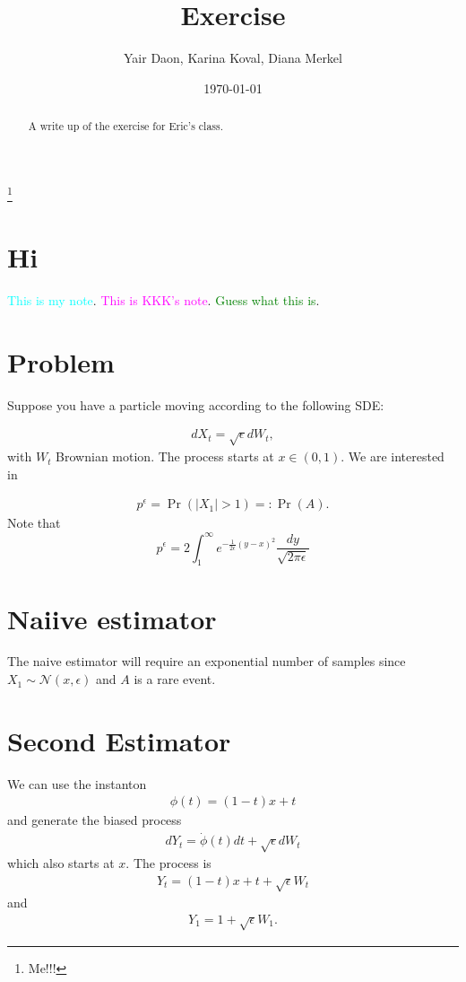 \documentclass[11pt]{amsart}
\newcommand{\N}{\mathcal{N}}
\newcommand{\want}{p^{\epsilon}}
\newcommand{\noise}{\sqrt{\epsilon}}
\newcommand{\kknote}[1]{{\textcolor{magenta}{#1}}}
\newcommand{\ydnote}[1]{{\textcolor{cyan}{#1}}}
\newcommand{\dmnote}[1]{{\textcolor{green}{#1}}}
\begin{document}
\title{Exercise}

\author{Yair Daon, Karina Koval, Diana Merkel}
\address{Courant Institute of Mathematical Sciences \\ New York University \\ 251 Mercer St., New York, NY}


\thanks{Me!!!} 
\date{\today}

\begin{abstract}
  A write up of the exercise for Eric's class.
\end{abstract}


\maketitle


\section{Hi}
\ydnote{This is my note}. \kknote{This is KKK's note}. \dmnote{Guess what this is}.
\section{Problem}
Suppose you have a particle moving according to the following SDE:

\begin{align*}
  dX_t = \noise dW_t,
\end{align*}
with $W_t$ Brownian motion. The process starts at $x \in (0,1)$. We are
interested in 

\begin{align*}
  \want = \Pr( |X_1| > 1 ) =:\Pr(A). 
\end{align*}
Note that
\begin{equation}
\want = 2 \int_{1}^{\infty} e^{-\frac{1}{2\epsilon}(y-x)^2} \frac{dy}{\sqrt{2\pi\epsilon}} 
\end{equation}

\section{Naiive estimator}
The naive estimator will require an exponential number of samples since 
$X_1 \sim \N( x, \epsilon )$ and $A$ is a rare event.

\section{Second Estimator}
We can use the instanton 
\begin{align*}
  \phi(t) = (1-t)x + t
\end{align*}
and generate the biased process
\begin{align*}
dY_t = \dot{\phi}(t)dt + \noise dW_t
\end{align*}
which also starts at $x$. The process is
\begin{align*}
  Y_t = (1-t)x + t + \noise W_t
\end{align*}
and
\begin{align*}
  Y_1 = 1 + \noise W_1.
\end{align*}
\end{document}

